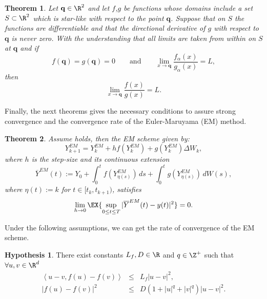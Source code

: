 \documentclass[sort&compress, preprint]{elsarticle}
\theoremstyle{definition}
\newtheorem{hypothesis}{Hypothesis}[section]
\theoremstyle{plain}%
\newtheorem{thm}{Theorem}[section]
\theoremstyle{remark}
\newcommand{\innerprod}[2]{\left\langle#1, #2\right\rangle}
\begin{document}
\begin{thm}\label{thm:Fine}
	Let $\mathbf{q}\in \R^2$ and let $f$,$g$ be functions whose domains include a set $S\subset \R^2$ which is 
	star-like 
	with  respect to the point $\mathbf{q}$. Suppose that on $S$ the functions are differentiable and that
	the directional derivative of $g$ with respect to $\mathbf{q}$ is never zero. With the understanding that all 
	limits are taken from within on $S$ at $\mathbf{q}$ and if
	$$f(\mathbf{q})=g(\mathbf{q})=0 \qquad \mbox{and} \qquad
				\displaystyle
				\lim_{x \to \mathbf{q}}
				\frac{f_{\alpha}(x)}{g_{\alpha}(x)} = L,$$
	then
	$$
		\lim_{x \to \mathbf{q}}
		\frac{f(x)}{g(x)} = L.
	$$
\end{thm}
 Finally, the next theorems gives the necessary conditions to assure strong convergence and 
 the convergence rate of the Euler-Maruyama (EM) 
 method.  
\begin{thm}\label{thm:HighamMaoStuart}
	Assume  holds, then the EM scheme given by: 
	\begin{equation}\label{eqn:EulerMaruyamaHigham}
	Y^{EM}_{k+1}= Y^{EM}_k+hf(Y^{EM}_k) + g(Y^{EM}_k)\Delta W_k,
    \end{equation} 
	where $h$ is the step-size and its
	continuous  extension
	\begin{equation}\label{extE}
	\overline{Y}^{EM}(t):=Y_0+\int_0^t f (Y^{EM}_{\eta(s)})\,ds+\int_0^t g(Y^{EM}_{\eta(s)})\,dW(s),
	\end{equation}
	where $\eta(t):=k$ for $t\in[t_k,t_{k+1})$, satisfies
	\begin{equation}
		\lim_{h\to 0}
		\EX{\sup_{0\leq t\leq T}|\overline{Y}^{EM}(t)-y(t)|^2}=0.
	\end{equation}
\end{thm}	
Under the following assumptions, we can get the rate of convergence of the EM scheme.
\begin{hypothesis}\label{PolynomialGrowth}
	There exist constants $L_f, D\in \R$ and $q \in \Z^+$ such that $\forall u,v \in \R^d$
	\begin{eqnarray}
		\innerprod{u-v}{f(u)-f(v)}
			&\leq& L_f|u-v|^2, \nonumber \\
		|f(u) - f(v)|^2 
			&\leq& 
				D(1 + |u|^q +|v|^q) |u-v|^2.\nonumber
	\end{eqnarray}
\end{hypothesis}
\end{document}
